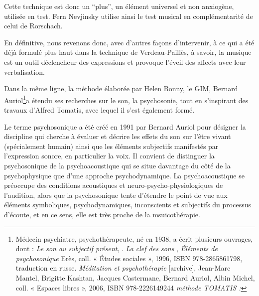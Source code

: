 Cette technique est donc un ``plus'', un élément universel et non
anxiogène, utilisée en test. Fern Nevjinsky utilise ainsi le test
musical en complémentarité de celui de Rorschach.

En définitive, nous revenons donc, avec d'autres façons d'intervenir,
à ce qui a été déjà formulé plus haut dans la technique de Verdeau-Paillès,
à savoir, la musique est un outil déclencheur des expressions et provoque
l'éveil des affects avec leur verbalisation.

Dans la même ligne, la méthode élaborée par Helen Bonny, le GIM,
Bernard Auriol\footnote{Médecin psychiatre, psychothérapeute, né en
  1938, a écrit plusieurs ouvrages, dont : \emph{Le son au subjectif
    présent}, \cite{auriol96sonausubjectifpresent}.
\emph{ La clef des sons} \cite{Auri96:clesons}, \emph{Éléments de
  psychosonique} Erès, coll. « Études sociales », 1996, ISBN
978-2865861798, traduction en russe. \emph{Méditation et
  psychothérapie} {[}archive{]}, Jean-Marc Mantel, Brigitte Kashtan,
Jacques Castermane, Bernard Auriol, Albin Michel, coll. « Espaces
libres », 2006, ISBN 978-2226149244\emph{ méthode TOMATIS :} }a étendu
ses recherches sur le son, la psychosonie, tout en s'inspirant des
travaux d'Alfred Tomatis, avec lequel il s'est également formé.

Le terme psychosonique a été créé en 1991 par Bernard Auriol pour
désigner la discipline qui cherche à évaluer et décrire les effets du
son sur l'être vivant (spécialement humain) ainsi que les éléments
subjectifs manifestés par l'expression sonore, en particulier la voix.
Il convient de distinguer la psychosonique de la psychoacoustique qui
se situe davantage du côté de la psychophysique que d'une approche
psychodynamique. La psychoacoustique se préoccupe des conditions
acoustiques et neuro-psycho-physiologiques de l'audition, alors que la
psychosonique tente d'étendre le point de vue aux éléments
symboliques, psychodynamiques, inconscients et subjectifs du processus
d'écoute, et en ce sens, elle est très proche de la msuicothérapie.
  

